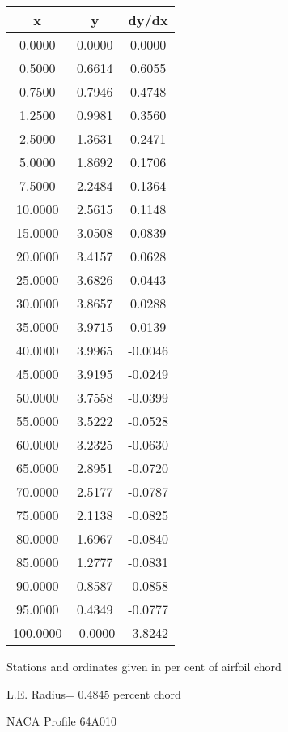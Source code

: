 \documentclass[11pt]{book}
\begin{document}
 \vspace{8mm}
 \begin{tabular}{|c|c|c|} \hline 
  x  &  y  &  dy/dx \\
 \hline
0.0000 & 0.0000 & 0.0000 \\
0.5000 & 0.6614 & 0.6055 \\
0.7500 & 0.7946 & 0.4748 \\
1.2500 & 0.9981 & 0.3560 \\
2.5000 & 1.3631 & 0.2471 \\
5.0000 & 1.8692 & 0.1706 \\
7.5000 & 2.2484 & 0.1364 \\
10.0000 & 2.5615 & 0.1148 \\
15.0000 & 3.0508 & 0.0839 \\
20.0000 & 3.4157 & 0.0628 \\
25.0000 & 3.6826 & 0.0443 \\
30.0000 & 3.8657 & 0.0288 \\
35.0000 & 3.9715 & 0.0139 \\
40.0000 & 3.9965 & -0.0046 \\
45.0000 & 3.9195 & -0.0249 \\
50.0000 & 3.7558 & -0.0399 \\
55.0000 & 3.5222 & -0.0528 \\
60.0000 & 3.2325 & -0.0630 \\
65.0000 & 2.8951 & -0.0720 \\
70.0000 & 2.5177 & -0.0787 \\
75.0000 & 2.1138 & -0.0825 \\
80.0000 & 1.6967 & -0.0840 \\
85.0000 & 1.2777 & -0.0831 \\
90.0000 & 0.8587 & -0.0858 \\
95.0000 & 0.4349 & -0.0777 \\
100.0000 & -0.0000 & -3.8242 \\
 \hline
 \end{tabular}
 \vspace{8mm}


Stations and ordinates given in per cent of airfoil chord 


L.E. Radius=  0.4845 percent chord
 \newpage
  \label{p64A010}
 \begin{Large}
 NACA Profile 64A010
 \end{Large}
  
\end{document}
